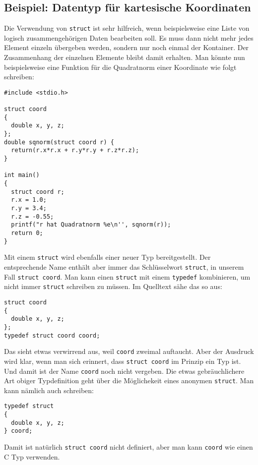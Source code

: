 \subsection{Beispiel: Datentyp für kartesische Koordinaten}

Die Verwendung von \verb|struct| ist sehr hilfreich, wenn beispielsweise eine Liste von logisch zusammengehörigen Daten bearbeiten soll.
Es muss dann nicht mehr jedes Element einzeln übergeben werden, sondern nur noch einmal der Kontainer.
Der Zusammenhang der einzelnen Elemente bleibt damit erhalten.
Man könnte nun beispielsweise eine Funktion für die Quadratnorm einer Koordinate wie folgt schreiben:
\begin{lstlisting}
#include <stdio.h>

struct coord
{
  double x, y, z;
};
double sqnorm(struct coord r) {
  return(r.x*r.x + r.y*r.y + r.z*r.z);
}

int main()
{
  struct coord r;
  r.x = 1.0;
  r.y = 3.4;
  r.z = -0.55;
  printf("r hat Quadratnorm %e\n'', sqnorm(r));
  return 0;
}
\end{lstlisting}
Mit einem \verb|struct| wird ebenfalls einer neuer Typ bereitgestellt.
Der entsprechende Name enthält aber immer das Schlüsselwort \verb|struct|, in unserem Fall \verb|struct coord|. 
Man kann einen \verb|struct| mit einem \verb|typedef| kombinieren, um nicht immer \verb|struct| schreiben zu müssen.
Im Quelltext sähe das so aus:
\begin{lstlisting}
struct coord
{
  double x, y, z;
};
typedef struct coord coord;
\end{lstlisting}
Das sieht etwas verwirrend aus, weil \verb|coord| zweimal auftaucht.
Aber der Ausdruck wird klar, wenn man sich erinnert, dass \verb|struct coord| im Prinzip ein Typ ist.
Und damit ist der Name \verb|coord| noch nicht vergeben.
Die etwas gebräuchlichere Art obiger Typdefinition geht über die Möglichekeit eines anonymen \verb|struct|.
Man kann nämlich auch schreiben:
\begin{lstlisting}
typedef struct
{
  double x, y, z;
} coord;
\end{lstlisting}
Damit ist natürlich \verb|struct coord| nicht definiert, aber man kann \verb|coord| wie einen C Typ verwenden.


\endinput

